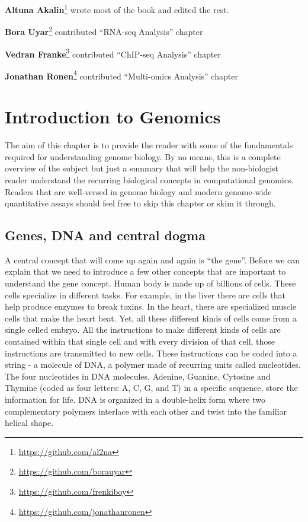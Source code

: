 \documentclass[12pt,]{krantz}
\renewcommand{\href}[2]{#2\footnote{\url{#1}}}
\begin{document}
\href{https://github.com/al2na}{\textbf{Altuna Akalin}} wrote most of the book and edited the rest.

\href{https://github.com/borauyar}{\textbf{Bora Uyar}} contributed ``RNA-seq Analysis'' chapter

\href{https://github.com/frenkiboy}{\textbf{Vedran Franke}} contributed ``ChIP-seq Analysis'' chapter

\href{https://github.com/jonathanronen}{\textbf{Jonathan Ronen}} contributed ``Multi-omics Analysis'' chapter

\mainmatter

\hypertarget{intro}{%
\chapter{Introduction to Genomics}\label{intro}}

The aim of this chapter is to provide the reader with some of the fundamentals
required for
understanding genome biology. By no means, this is a complete overview of the
subject but just a summary that will help the non-biologist reader understand
the recurring biological concepts in computational genomics. Readers that are
well-versed in genome biology and modern genome-wide quantitative assays should
feel
free to skip this chapter or skim it through.

\hypertarget{genes-dna-and-central-dogma}{%
\section{Genes, DNA and central dogma}\label{genes-dna-and-central-dogma}}

A central concept that will come up again and again is ``the gene''.
Before we can explain that we need to
introduce a few other concepts that are important to understand the gene concept.
Human body is made up of billions of cells. These cells specialize in different
tasks. For example, in the liver there are cells that help produce enzymes
to break toxins. In the heart, there are specialized muscle cells that make
the heart beat. Yet, all these different kinds of cells come from a single celled
embryo. All the instructions to make different kinds of cells are contained
within that single cell and with every division of that cell,
those instructions
are transmitted to new cells. These instructions can be coded into a string - a
molecule of DNA, a polymer made of recurring units called nucleotides. The four
nucleotides in DNA molecules, Adenine, Guanine, Cytosine and Thymine (coded as
four letters: A, C, G, and T) in a specific sequence, store the information for
life. DNA is organized in a double-helix form where two complementary polymers
interlace with each other and twist into the familiar helical shape.
\end{document}
